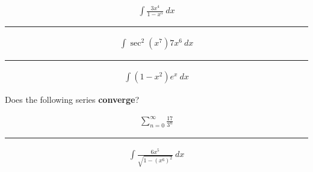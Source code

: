 \documentclass{article}
\begin{document}
\begin{landscape}
\thispagestyle{empty}

\begin{multicols}{2}

{\Huge

\begin{align}
\int \frac{3x^4}{1-x^5} \ dx 
\end{align}
\vspace{0.3in}
\hrule
\vspace{0.3in}

\begin{align}
\int \sec^2\left(x^7\right)7x^6 \ dx
\end{align}

\vspace{0.3in}
\hrule
\vspace{0.3in}

\begin{align}
\int \left(1-x^2\right)e^x \ dx
\end{align}

\columnbreak


\begin{center}
Does the following series {\bf converge}?
\end{center}
\begin{align}
\sum_{n=0}^{\infty} \frac{17}{3^n}
\end{align}

\vspace{0.3in}
\hrule
\vspace{0.3in}

\begin{align}
\int \frac{6x^5}{\sqrt{1-\left(x^6\right)^2}} \ dx 
\end{align}

}

\end{multicols}
\end{landscape}
\end{document}
